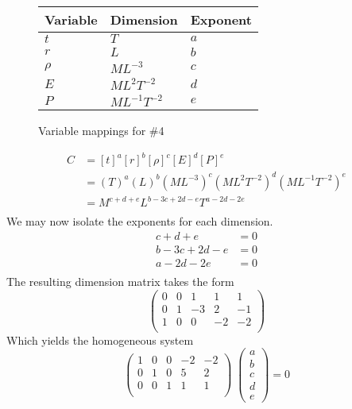 \documentclass[12pt]{article}
\begin{document}
  \begin{figure}
    \centering
    \begin{tabularx}{0.5\textwidth}{XXX}
      Variable & Dimension & Exponent \\ \midrule
      $t$ & $T$ & $a$ \\
      $r$ & $L$ & $b$ \\
      $\rho$ & $ML^{-3}$ & $c$ \\
      $E$ & $ML^{2}T^{-2}$ & $d$ \\
      $P$ & $ML^{-1}T^{-2}$ & $e$ \\
    \end{tabularx}
    \caption{Variable mappings for \#4}
\label{fig:4-var-mappings}
  \end{figure}
  \begin{equation*}
    \begin{aligned}
      C &= {[t]}^a {[r]}^b {[\rho]}^c {[E]}^d {[P]}^e \\
      &= {(T)}^a{(L)}^b{(ML^{-3})}^c{(ML^2T^{-2})}^d{(ML^{-1}T^{-2})}^e \\
      &= M^{c+d+e}L^{b-3c+2d-e}T^{a-2d-2e} \\
    \end{aligned}
  \end{equation*}
  We may now isolate the exponents for each dimension.
  \begin{equation*}
    \begin{aligned}
      c + d + e &= 0 \\
      b - 3c + 2d - e &= 0 \\
      a - 2d - 2e &= 0 \\
    \end{aligned}
  \end{equation*}
  The resulting dimension matrix takes the form
  \begin{equation*}
    \begin{pmatrix}
      0 & 0 & 1 & 1 & 1 \\
      0 & 1 & -3 & 2 & -1 \\
      1 & 0 & 0 & -2 & -2 \\
    \end{pmatrix}
  \end{equation*}
  Which yields the homogeneous system
  \begin{equation*}
    \begin{pmatrix}
      1 & 0 & 0 & -2 & -2 \\
      0 & 1 & 0 & 5 & 2 \\
      0 & 0 & 1 & 1 & 1 \\
    \end{pmatrix} \;
    \begin{pmatrix}
      a \\ b \\ c \\ d \\ e
    \end{pmatrix}
    = 0
  \end{equation*}
\end{document}
